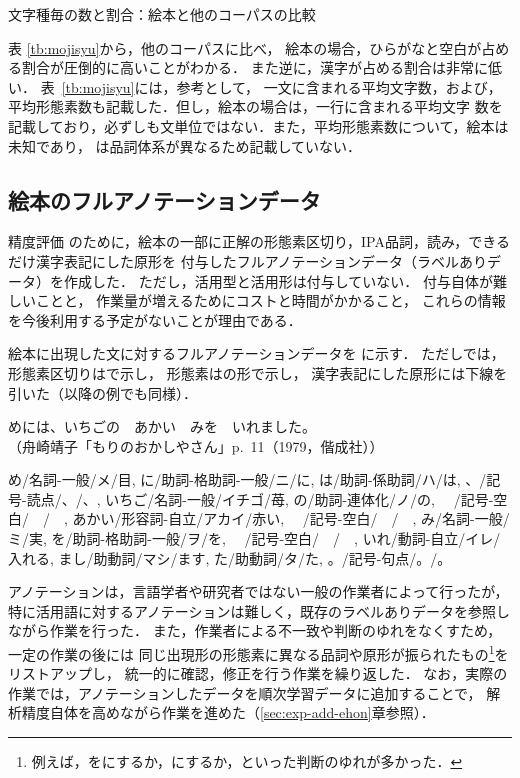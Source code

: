 \documentclass[japanese]{jnlp_1.4}
\newcommand{\bccwj}{}
\newcommand{\refs}[1]{}
\newcommand{\ul}{}
\newcommand{\pos}[1]{}
\begin{document}
\begin{table}[t]
\caption{文字種毎の数と割合：絵本と他のコーパスの比較}
\label{tb:mojisyu}

\end{table}

表 \ref{tb:mojisyu}から，他のコーパスに比べ，
絵本の場合，ひらがなと空白が占める割合が圧倒的に高いことがわかる．
また逆に，漢字が占める割合は非常に低い．
表~\ref{tb:mojisyu}には，参考として，
一文に含まれる平均文字数，および，平均形態素数も記載した．但し，絵本の場合は，一行に含まれる平均文字
数を記載しており，必ずしも文単位ではない．また，平均形態素数について，絵本は未知であり，
\bccwj は品詞体系が異なるため記載していない．


\subsection{絵本のフルアノテーションデータ}
\label{sec:full-ano}

精度評価
のために，絵本の一部に正解の形態素区切り，IPA品詞，読み，できるだけ漢字表記にした原形を
付与したフルアノテーションデータ（ラベルありデータ）を作成した．
ただし，活用型と活用形は付与していない．
付与自体が難しいことと，
作業量が増えるためにコストと時間がかかること，
これらの情報を今後利用する予定がないことが理由である．

絵本に出現した文\refs{eva-org}に対するフルアノテーションデータを
\refs{ehon-full}に示す．
ただし\refs{ehon-full}では，形態素区切りは\jpn[,]{}で示し，
形態素は\jpn[出現形/品詞/読み/原形]{}の形で示し，
漢字表記にした原形には\ul{下線}を引いた（以降の例でも同様）．

\begin{exe}
 \ex \label{s:eva-org}
めには、いちごの　あかい　みを　いれました。\\
\small （舟崎靖子「もりのおかしやさん」p.~11（1979，偕成社））
\end{exe} 

\begin{exe}
 \ex \label{s:ehon-full}
め/名詞-一般/メ/\ul{目},
に/助詞-格助詞-一般/ニ/に,
は/助詞-係助詞/ハ/は,
、/記号-読点/、/、,
いちご/名詞-一般/イチゴ/\ul{苺},
の/助詞-連体化/ノ/の,
　/記号-空白/　/　,
あかい/形容詞-自立/アカイ/\ul{赤い},
　/記号-空白/　/　,
み/名詞-一般/ミ/\ul{実},
を/助詞-格助詞-一般/ヲ/を,
　/記号-空白/　/　,
いれ/動詞-自立/イレ/\ul{入れる},
まし/助動詞/マシ/ます,
た/助動詞/タ/た,
。/記号-句点/。/。
 \end{exe}

アノテーションは，言語学者や研究者ではない一般の作業者によって行ったが，
特に活用語に対するアノテーションは難しく，既存のラベルありデータを参照しながら作業を行った．
また，作業者による不一致や判断のゆれをなくすため，一定の作業の後には
同じ出現形の形態素に異なる品詞や原形が振られたもの\footnote{例えば，\jpn[ごしごし]{}を\pos{名詞-サ変接続}にするか，\pos{副詞-一般}にするか，といった判断のゆれが多かった．}をリストアップし，
統一的に確認，修正を行う作業を繰り返した．
なお，実際の作業では，アノテーションしたデータを順次学習データに追加することで，
解析精度自体を高めながら作業を進めた（\ref{sec:exp-add-ehon}章参照）．
\end{document}
